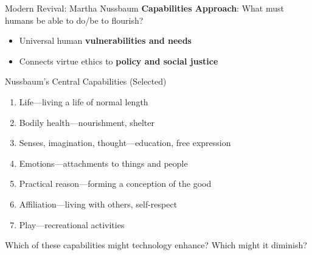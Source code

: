 ﻿\documentclass[aspectratio=169,11pt]{beamer}
\begin{document}
\begin{frame}{Modern Revival: Martha Nussbaum}
\textbf{Capabilities Approach}: What must humans be able to do/be to flourish?

\begin{itemize}
    \item Universal human \textbf{vulnerabilities and needs}
    \item Connects virtue ethics to \textbf{policy and social justice}
\end{itemize}

\vspace{0.2cm}
\begin{block}{Nussbaum's Central Capabilities (Selected)}
\footnotesize
\begin{enumerate}
    \item Life---living a life of normal length
    \item Bodily health---nourishment, shelter
    \item Senses, imagination, thought---education, free expression
    \item Emotions---attachments to things and people
    \item Practical reason---forming a conception of the good
    \item Affiliation---living with others, self-respect
    \item Play---recreational activities
\end{enumerate}
\end{block}

\begin{discussionbox}[Discussion]
Which of these capabilities might technology enhance? Which might it diminish?
\end{discussionbox}
\end{frame}
\end{document}
